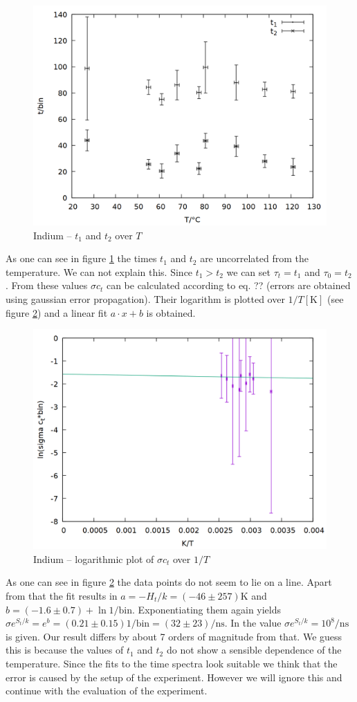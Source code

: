 \begin{figure}
\centering
\includegraphics[width=0.7\linewidth]{auswertung/times.png}
\caption{Indium -- $t_1$ and $t_2$ over $T$}
\label{fig:indium_times}
\end{figure}

As one can see in figure \ref{fig:indium_times} the times $t_1$ and $t_2$ are uncorrelated from the temperature. We can not explain this. Since $t_1 > t_2$ we can set $\tau_t = t_1$ and $\tau_0 = t_2$. From these values $\sigma c_t$ can be calculated according to eq. ?? (errors are obtained using gaussian error propagation). Their logarithm is plotted over $1/T[\si{\kelvin}]$ (see figure \ref{fig:indium_res}) and a linear fit $a\cdot x + b$ is obtained. 

\begin{figure}
\centering
\includegraphics[width=0.7\linewidth]{auswertung/fit.png}
\caption{Indium -- logarithmic plot of $\sigma c_t$ over $1/T$}
\label{fig:indium_res}
\end{figure}

As one can see in figure \ref{fig:indium_res} the data points do not seem to lie on a line. Apart from that the fit results in $a = -H_t/k = (-46 \pm 257) \si{\kelvin}$ and $b = (-1.6 \pm 0.7) + \ln{1/\mathrm{bin}}$. Exponentiating them again yields $\sigma e^{S_t/k} = e^b = (0.21 \pm 0.15) 1/\mathrm{bin} = (32 \pm 23) /\si{\nano\second}$. In \cite{weiler} the value $\sigma e^{S_t/k} = 10^8/\si{\nano\second}$ is given. Our result differs by about 7 orders of magnitude from that. We guess this is because the values of $t_1$ and $t_2$ do not show a sensible dependence of the temperature. Since the fits to the time spectra look suitable we think that the error is caused by the setup of the experiment. However we will ignore this and continue with the evaluation of the experiment.

